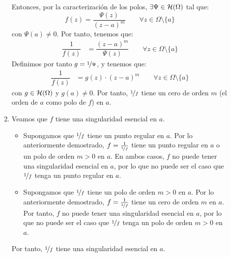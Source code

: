 \begin{ejercicio}
\begin{description}
\begin{enumerate}
            Entonces, por la caracterización de los polos, $\exists \Psi \in \mathcal{H}(\Omega)$ tal que:
            \begin{equation*}
                f(z) = \dfrac{\Psi(z)}{(z - a)^m}\qquad \forall z \in \Omega \setminus \{a\}
            \end{equation*}
            con $\Psi(a) \neq 0$. Por tanto, tenemos que:
            \begin{align*}
                \dfrac{1}{f(z)} &= \dfrac{(z - a)^m}{\Psi(z)}\qquad \forall z \in \Omega \setminus \{a\}
            \end{align*}
            Definimos por tanto $g=\nicefrac{1}{\Psi}$, y tenemos que:
            \begin{align*}
                \dfrac{1}{f(z)} &= g(z) \cdot (z - a)^m\qquad \forall z \in \Omega \setminus \{a\}
            \end{align*}
            con $g \in \mathcal{H}(\Omega)$ y $g(a) \neq 0$. Por tanto, $\nicefrac{1}{f}$ tiene un cero de orden $m$ (el orden de $a$ como polo de $f$) en $a$.


            \item Veamos que $f$ tiene una singularidad esencial en $a$.
            \begin{itemize}
                \item Supongamos que $\nicefrac{1}{f}$ tiene un punto regular en $a$. Por lo anteriormente demostrado, $f=\frac{1}{\nicefrac{1}{f}}$ tiene un punto regular en $a$ o un polo de orden $m > 0$ en $a$. En ambos casos, $f$ no puede tener una singularidad esencial en $a$, por lo que no puede ser el caso que $\nicefrac{1}{f}$ tenga un punto regular en $a$.
                
                \item Supongamos que $\nicefrac{1}{f}$ tiene un polo de orden $m > 0$ en $a$. Por lo anteriormente demostrado, $f=\frac{1}{\nicefrac{1}{f}}$ tiene un cero de orden $m$ en $a$. Por tanto, $f$ no puede tener una singularidad esencial en $a$, por lo que no puede ser el caso que $\nicefrac{1}{f}$ tenga un polo de orden $m > 0$ en $a$.
            \end{itemize}

            Por tanto, $\nicefrac{1}{f}$ tiene una singularidad esencial en $a$.
        \end{enumerate}
    \end{description}
\end{ejercicio}

